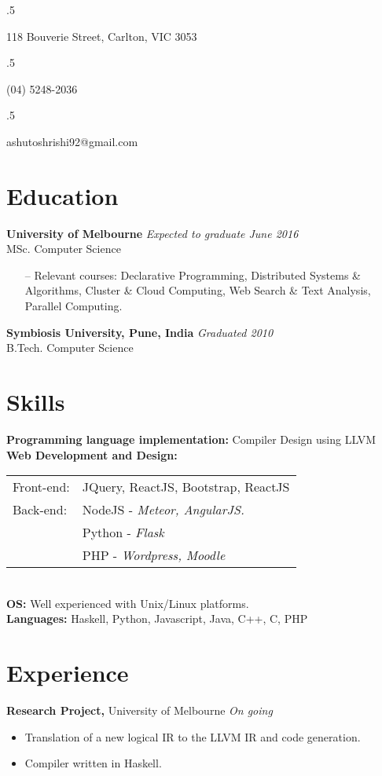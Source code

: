 \documentclass[margin]{res}
\begin{document}

\begin{resume}
  \moveleft.5\hoffset\centerline{118 Bouverie Street, Carlton, VIC 3053}
  \moveleft.5\hoffset\centerline{(04) 5248-2036}
  \moveleft.5\hoffset\centerline{ashutoshrishi92@gmail.com}
  
  \section{Education}  
  \textbf{University of Melbourne} \hfill \textit{Expected to graduate June 2016} \\
  MSc. Computer Science 
  \begin{itemize} \itemsep -2pt
  \item[--] Relevant courses: Declarative Programming, Distributed Systems \&\\ 
    Algorithms, Cluster \& Cloud Computing, Web Search \& Text Analysis, \\ 
    Parallel Computing.
  \end{itemize}

  \textbf{Symbiosis University, Pune, India} \hfill \textit{Graduated 2010} \\
  B.Tech. Computer Science 

  \section{Skills}  
  \textbf{Programming language implementation:} Compiler Design using LLVM \\
  \textbf{Web Development and Design:} \\
  \begin{tabular}{l l}
    Front-end: & JQuery, ReactJS, Bootstrap, ReactJS \\
    Back-end: & NodeJS -  \textit{Meteor, AngularJS.}\\ 
              & Python -  \textit{Flask} \\
              & PHP -  \textit{Wordpress, Moodle} \\

  \end{tabular}\\
  \textbf{OS:} Well experienced with Unix/Linux platforms. \\  
  \textbf{Languages:} Haskell, Python, Javascript, Java, C++, C, PHP 

  \section{Experience}
  \textbf{Research Project,} University of Melbourne \hfill \textit{On going}
  \begin{itemize} \itemsep -2pt
  \item Translation of a new logical IR to the LLVM IR and code generation.
  \item Compiler written in Haskell.
  \end{itemize}


\end{resume}
\end{document}
